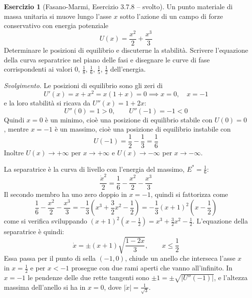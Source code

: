 \documentclass[11pt, a4paper, openright]{book}
\theoremstyle{plain}
\theoremstyle{definition}
\newtheorem{esercizio}[teorema]{Esercizio}
\theoremstyle{remark}
\begin{document}
\begin{esercizio}[Fasano-Marmi, Esercizio 3.7.8 -- svolto]
    Un punto materiale di massa unitaria si muove lungo l'asse $x$ sotto l'azione di un campo di forze conservativo con energia potenziale
    \begin{equation}
        U(x) = \frac{x^2}{2} + \frac{x^3}{3}
    \end{equation}
    Determinare le posizioni di equilibrio e discuterne la stabilità. Scrivere l'equazione della curva separatrice nel piano delle fasi e disegnare le curve di fase corrispondenti ai valori $0$, $\frac{1}{8}$, $\frac{1}{6}$, $\frac{1}{5}$, $\frac{1}{2}$ dell'energia.
\end{esercizio}

\textit{Svolgimento.} Le posizioni di equilibrio sono gli zeri di
\begin{equation}
    U'(x) = x + x^2 = x(1 + x) = 0 \implies x = 0, \quad x = -1
\end{equation}
e la loro stabilità si ricava da $U''(x) = 1 + 2x$:
\begin{equation}
    U''(0) = 1 > 0, \qquad U''(-1) = -1 < 0
\end{equation}
Quindi $x = 0$ è un minimo, cioè una posizione di equilibrio stabile con $U(0) = 0$, mentre $x = -1$ è un massimo, cioè una posizione di equilibrio instabile con
\begin{equation}
    U(-1) = \frac{1}{2} - \frac{1}{3} = \frac{1}{6}
\end{equation}
Inoltre $U(x) \to +\infty$ per $x \to +\infty$ e $U(x) \to -\infty$ per $x \to -\infty$.

La separatrice è la curva di livello con l'energia del massimo, $E^* = \frac{1}{6}$:
\begin{equation}
    \frac{\dot{x}^2}{2} = \frac{1}{6} - \frac{x^2}{2} - \frac{x^3}{3}
\end{equation}
Il secondo membro ha uno zero doppio in $x = -1$, quindi si fattorizza come
\begin{equation}
    \frac{1}{6} - \frac{x^2}{2} - \frac{x^3}{3} = -\frac{1}{3}\left(x^3 + \frac{3}{2}x^2 - \frac{1}{2}\right) = -\frac{1}{3}(x + 1)^2\left(x - \frac{1}{2}\right)
\end{equation}
come si verifica sviluppando $(x + 1)^2\left(x - \frac{1}{2}\right) = x^3 + \frac{3}{2}x^2 - \frac{1}{2}$. L'equazione della separatrice è quindi:
\begin{equation}
    \dot{x} = \pm(x + 1)\sqrt{\frac{1 - 2x}{3}}, \qquad x \leq \frac{1}{2}
\end{equation}
Essa passa per il punto di sella $(-1, 0)$, chiude un anello che interseca l'asse $x$ in $x = \frac{1}{2}$ e per $x < -1$ prosegue con due rami aperti che vanno all'infinito. In $x = -1$ le pendenze delle due rette tangenti sono $\pm 1 = \pm\sqrt{|U''(-1)|}$, e l'altezza massima dell'anello si ha in $x = 0$, dove $|\dot{x}| = \frac{1}{\sqrt{3}}$.
\end{document}
